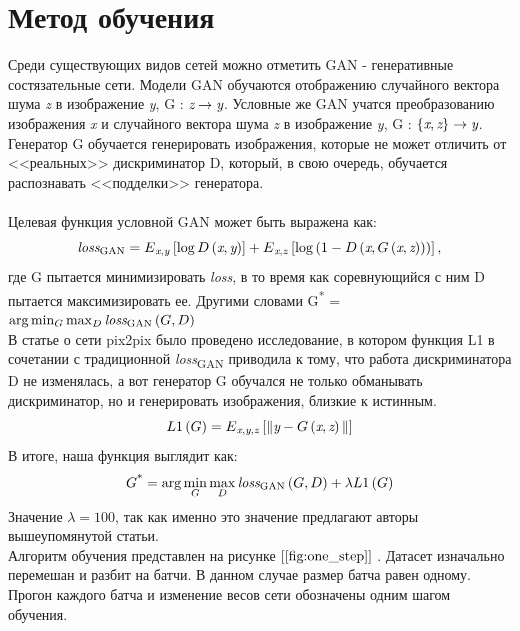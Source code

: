 \documentclass{article}
\begin{document}
\section*{Метод обучения}
Среди существующих видов сетей можно отметить GAN - генеративные состязательные сети. Модели GAN обучаются отображению случайного вектора шума \emph{z} в изображение \emph{y}, G : $\emph{z} \rightarrow \emph{y}$. Условные же GAN учатся преобразованию изображения \emph{x} и случайного вектора шума \emph{z} в изображение \emph{y}, G : $\left\lbrace \emph{x}, \emph{z} \right\rbrace \rightarrow \emph{y}$. 
Генератор G обучается генерировать изображения, которые не может отличить от <<реальных>> дискриминатор D, который, в свою очередь, обучается распознавать <<подделки>> генератора. \\\\
Целевая функция условной GAN может быть выражена как:
\[\textit{loss}\textsubscript{GAN} = E\textsubscript{\emph{x},\emph{y}}\left[ {\log D\left( \emph{x}, \emph{y} \right) } \right] + E\textsubscript{\emph{x},\emph{z}}\left[ {\log \left( 1 - D\left( \emph{x}, G \left(\emph{x},\emph{z} \right) \right) \right) } \right], \]
где G пытается минимизировать \emph{loss}, в то время как соревнующийся с ним D пытается максимизировать ее. Другими словами G\textsuperscript{*} = $\arg \min_{G} \max_{D} \emph{loss}\textsubscript{GAN}\left( G, D \right)$
\\ В статье о сети pix2pix было проведено исследование, в котором функция L1 в сочетании с традиционной \emph{loss}\textsubscript{GAN} приводила к тому, что работа дискриминатора D не изменялась, а вот генератор G обучался не только обманывать дискриминатор, но и генерировать изображения, близкие к истинным.
\[ L1\left(G\right) = E\textsubscript{\emph{x},\emph{y},\emph{z}}\left[\|\emph{y} - G\left(\emph{x},\emph{z}\right)\|\right]\]
В итоге, наша функция выглядит как:
\[ G\textsuperscript{*} = \arg \min_{G} \max_{D} \emph{loss}\textsubscript{GAN}\left( G, D \right) + \lambda L1\left( G \right) \]
Значение $\lambda=100$, так как именно это значение предлагают авторы вышеупомянутой статьи. \\
Алгоритм обучения представлен на рисунке $\left[ \ref{fig:one_step}\right]$ . Датасет изначально перемешан и разбит на батчи. В данном случае размер батча равен одному. Прогон каждого батча и изменение весов сети обозначены одним шагом обучения.
\end{document}
